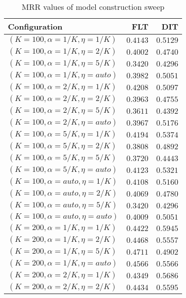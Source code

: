 
\begin{table}
\begin{spacing}{1.2}
\centering
\caption{MRR values of \bookkeeper model construction sweep}
\label{table:bookkeeper_model_sweep}
\vspace{0.2em}
\parbox{.45\linewidth}{\centering \begin{tabular}{lrr}
\toprule
                   Configuration &      FLT &      DIT \\
\midrule
   $(K=100,\alpha=1/K,\eta=1/K)$ & $0.4143$ & $0.5129$ \\
   $(K=100,\alpha=1/K,\eta=2/K)$ & $0.4002$ & $0.4740$ \\
   $(K=100,\alpha=1/K,\eta=5/K)$ & $0.3420$ & $0.4296$ \\
  $(K=100,\alpha=1/K,\eta=auto)$ & $0.3982$ & $0.5051$ \\
   $(K=100,\alpha=2/K,\eta=1/K)$ & $0.4208$ & $0.5097$ \\
   $(K=100,\alpha=2/K,\eta=2/K)$ & $0.3963$ & $0.4755$ \\
   $(K=100,\alpha=2/K,\eta=5/K)$ & $0.3611$ & $0.4392$ \\
  $(K=100,\alpha=2/K,\eta=auto)$ & $0.3967$ & $0.5176$ \\
   $(K=100,\alpha=5/K,\eta=1/K)$ & $0.4194$ & $0.5374$ \\
   $(K=100,\alpha=5/K,\eta=2/K)$ & $0.3808$ & $0.4892$ \\
   $(K=100,\alpha=5/K,\eta=5/K)$ & $0.3720$ & $0.4443$ \\
  $(K=100,\alpha=5/K,\eta=auto)$ & $0.4123$ & $0.5321$ \\
  $(K=100,\alpha=auto,\eta=1/K)$ & $0.4108$ & $0.5160$ \\
  $(K=100,\alpha=auto,\eta=2/K)$ & $0.4069$ & $0.4780$ \\
  $(K=100,\alpha=auto,\eta=5/K)$ & $0.3420$ & $0.4296$ \\
 $(K=100,\alpha=auto,\eta=auto)$ & $0.4009$ & $0.5051$ \\
   $(K=200,\alpha=1/K,\eta=1/K)$ & $0.4422$ & $0.5945$ \\
   $(K=200,\alpha=1/K,\eta=2/K)$ & $0.4468$ & $0.5557$ \\
   $(K=200,\alpha=1/K,\eta=5/K)$ & $0.4711$ & $0.4902$ \\
  $(K=200,\alpha=1/K,\eta=auto)$ & $0.4566$ & $0.5566$ \\
   $(K=200,\alpha=2/K,\eta=1/K)$ & $0.4349$ & $0.5686$ \\
   $(K=200,\alpha=2/K,\eta=2/K)$ & $0.4434$ & $0.5595$ \\

\end{tabular}}
\end{spacing}
\end{table}
